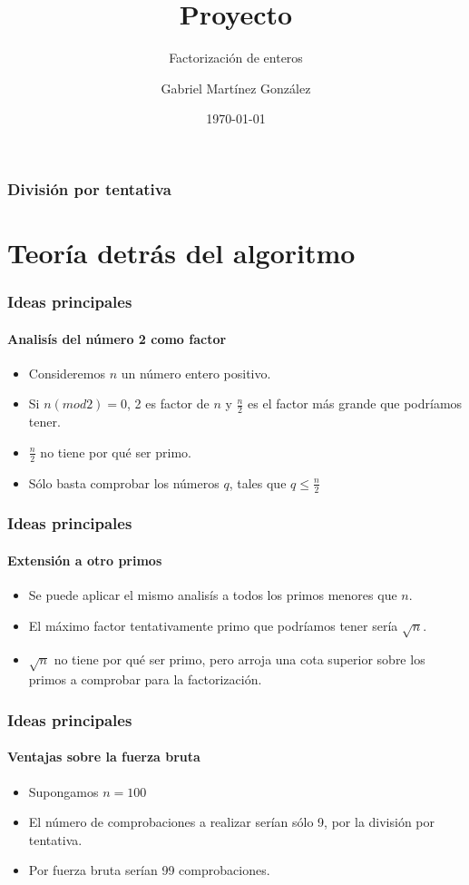 \documentclass{beamer}
\title{Proyecto}
\subtitle{Factorizaci\'on de enteros}
\author[Mart\'inez] 
{Gabriel Mart\'{i}nez Gonz\'alez}
\institute[ESFM] 
{
  Escuela Superior de F\'{\i}sica y Matem\'aticas\\
  Instituto Polit\'ecnico Nacional}
\date[\today]{\today}
\begin{document}
\begin{frame}
  \titlepage
\end{frame}

\begin{frame}
  \frametitle{Divisi\'on por tentativa}

  \tableofcontents
\end{frame}

\section{Teor\'{i}a detr\'as del algoritmo}

\begin{frame}
  \frametitle{Ideas principales}
  \framesubtitle{Analis\'{i}s del n\'umero 2 como factor}

  \begin{itemize}[<+->] %
  \item Consideremos $n$ un n\'umero entero positivo.
  \item Si $n(mod2)=0$, 2 es factor de $n$ y $\frac{n}{2}$ es el factor m\'as grande que podr\'{i}amos tener.
  \item $\frac{n}{2}$ no tiene por qu\'e ser primo.
  \item S\'olo basta comprobar los n\'umeros $q$, tales que $q\leq\frac{n}{2}$
  \end{itemize}
\end{frame}
\begin{frame}
  \frametitle{Ideas principales}
  \framesubtitle{Extensi\'on a otro primos}

  \begin{itemize}[<+->] %
  \item Se puede aplicar el mismo analis\'{i}s a todos los primos menores que $n$.
  \item El m\'aximo factor tentativamente primo que podr\'{i}amos tener ser\'{i}a $\sqrt{n}$.
  \item $\sqrt{n}$ no tiene por qu\'e ser primo, pero arroja una cota superior sobre los primos a comprobar para la factorizaci\'on.
  \end{itemize}
\end{frame}
\begin{frame}
  \frametitle{Ideas principales}
  \framesubtitle{Ventajas sobre la fuerza bruta}

  \begin{itemize}[<+->] %
  \item Supongamos $n=100$
  \item El n\'umero de comprobaciones a realizar ser\'ian s\'olo 9, por la divisi\'on por tentativa.
  \item Por fuerza bruta ser\'{i}an 99 comprobaciones.
  \end{itemize}
\end{frame}
\end{document}
